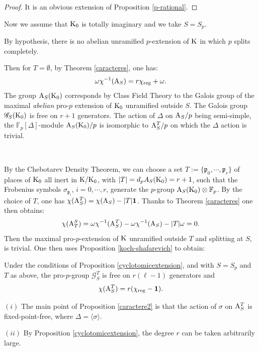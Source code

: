 \documentclass[12pt,a4paper,twoside,english]{smfart}
\def\K{{\rm K}}
\def\fq{{\mathbb F}}
\def\G{{\mathcal G}}
\def\p{{\mathfrak p}}
\def\GST{{\G_S^T}}
\def\A{{\rm A}}
\def\1{{\bf 1}}
\begin{document}
 \begin{proof}
It is an obvious extension of  Proposition \ref{p-rational}.
 \end{proof}
 
 
 
 Now we assume that $\K_0$ is totally imaginary  and we take $S=S_p$.
 
 
 
By hypothesis, there is no abelian unramified  $p$-extension of  $\K$  in which  $p$ splits completely.

Then for $T=\emptyset$, by Theorem \ref{caracteres}, one has:
 $$\omega \chi^{-1}(\A_S)= r \chi_{\mathrm{reg}} + \omega.$$
 The group  $\A_S(\K_0)$ corresponds by Class Field Theory to the Galois group of the maximal \emph{abelian} pro-$p$ extension of $\K_0$ unramified outside $S$. The Galois group  $\G_S(\K_0)$ is free on $r+1$ generators.
 The action of $\Delta$ on  $\A_S/p$ being semi-simple, the $\fq_p[\Delta]$-module $\A_S(\K_0)/p$ is isomorphic to  $\A_S^T/p$ on which the $\Delta$ action  is trivial.
 
 \
 
By the Chebotarev Density Theorem, we can choose a set  $T:=\{\p_0,\cdots, \p_r\}$ of places of  $\K_0$ all inert in $\K/\K_0$, with $|T|=d_p A_S(\K_0)=r+1$, such that 
 the Frobenius symbols 
 $\sigma_{\p_i}$, $i=0,\cdots, r$,  generate the $p$-group $\A_S(\K_0)\otimes \fq_p$.
 By the choice of $T$, one has $\chi(\A_S^T)=\chi(\A_S)- |T| \1$.
 Thanks to Theorem \ref{caracteres} one then obtains:
 $$ \chi(\A_T^S)= \omega \chi^{-1}(\A_S^T) -\omega \chi^{-1}(\A_S) - |T| \omega=0.$$
 Then the maximal  pro-$p$-extension of $\K$ unramified outside $T$ and splitting at $S$, is trivial.
One then uses Proposition  \ref{koch-shafarevich} to obtain:

\begin{prop} \label{caractere2} Under the conditions of 
Proposition \ref{cyclotomicextension}, and with $S=S_p$ and $T$ as above, the pro-$p$-group $\GST$ is free on   $r(\ell-1)$ generators and $$\chi(\A_S^T)= r(\chi_{\mathrm{reg}}-\1).$$
\end{prop}

 
\begin{rema}
 $(i)$ The main point of Proposition \ref{caractere2} is that the action of $\sigma$ on $\A_S^T$ is fixed-point-free, where $\Delta=\langle \sigma \rangle$.
 
 $(ii)$ By Proposition \ref{cyclotomicextension}, the degree $r$ can be taken arbitrarily large. 
\end{rema}
\end{document}
